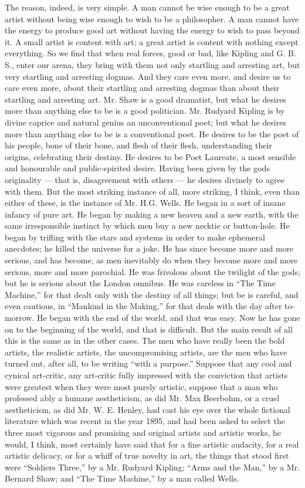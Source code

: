 The reason, indeed, is very simple. A man cannot be wise enough to be a great artist without being wise enough to wish to be a philosopher. A man cannot have the energy to produce good art without having the energy to wish to pass beyond it. A small artist is content with art; a great artist is content with nothing except everything. So we find that when real forces, good or bad, like Kipling and G. B. S., enter our arena, they bring with them not only startling and arresting art, but very startling and arresting dogmas. And they care even more, and desire us to care even more, about their startling and arresting dogmas than about their startling and arresting art. Mr. Shaw is a good dramatist, but what he desires more than anything else to be is a good politician. Mr. Rudyard Kipling is by divine caprice and natural genius an unconventional poet; but what he desires more than anything else to be is a conventional poet. He desires to be the poet of his people, bone of their bone, and flesh of their flesh, understanding their origins, celebrating their destiny. He desires to be Poet Laureate, a most sensible and honourable and public-spirited desire. Having been given by the gods originality — that is, disagreement with others — he desires divinely to agree with them. But the most striking instance of all, more striking, I think, even than either of these, is the instance of Mr. H.G. Wells. He began in a sort of insane infancy of pure art. He began by making a new heaven and a new earth, with the same irresponsible instinct by which men buy a new necktie or button-hole. He began by trifling with the stars and systems in order to make ephemeral anecdotes; he killed the universe for a joke. He has since become more and more serious, and has become, as men inevitably do when they become more and more serious, more and more parochial. He was frivolous about the twilight of the gods; but he is serious about the London omnibus. He was careless in “The Time Machine,” for that dealt only with the destiny of all things; but be is careful, and even cautious, in “Mankind in the Making,” for that deals with the day after to-morrow. He began with the end of the world, and that was easy. Now he has gone on to the beginning of the world, and that is difficult. But the main result of all this is the same as in the other cases. The men who have really been the bold artists, the realistic artists, the uncompromising artists, are the men who have turned out, after all, to be writing “with a purpose.” Suppose that any cool and cynical art-critic, any art-critic fully impressed with the conviction that artists were greatest when they were most purely artistic, suppose that a man who professed ably a humane aestheticism, as did Mr. Max Beerbohm, or a cruel aestheticism, as did Mr. W. E. Henley, had cast his eye over the whole fictional literature which was recent in the year 1895, and had been asked to select the three most vigorous and promising and original artists and artistic works, he would, I think, most certainly have said that for a fine artistic audacity, for a real artistic delicacy, or for a whiff of true novelty in art, the things that stood first were “Soldiers Three,” by a Mr. Rudyard Kipling; “Arms and the Man,” by a Mr. Bernard Shaw; and “The Time Machine,” by a man called Wells. 
